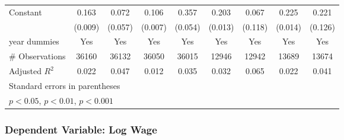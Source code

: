 \begin{sidewaystable}
\begin{tabular}{l*{2}{c}| *{2}{c}| *{2}{c}| *{2}{c}}
	Constant            &       0.163\sym{***}&       0.072         &       0.106\sym{***}&       0.357\sym{***}&       0.203\sym{***}&       0.067         &       0.225\sym{***}&       0.221         \\
	&     (0.009)         &     (0.057)         &     (0.007)         &     (0.054)         &     (0.013)         &     (0.118)         &     (0.014)         &     (0.126)         \\
	year dummies        &         Yes         &         Yes         &         Yes         &         Yes         &         Yes         &         Yes         &         Yes         &         Yes         \\
	\midrule
\#	Observations        &       36160         &       36132         &       36050         &       36015         &       12946         &       12942         &       13689         &       13674         \\
	Adjusted \(R^{2}\)  &       0.022         &       0.047         &       0.012         &       0.035         &       0.032         &       0.065         &       0.022         &       0.041         \\
	\bottomrule
	\multicolumn{9}{l}{\footnotesize Standard errors in parentheses}\\
	\multicolumn{9}{l}{\footnotesize \sym{*} \(p<0.05\), \sym{**} \(p<0.01\), \sym{***} \(p<0.001\)}
\end{tabular}
\end{sidewaystable}
\clearpage

\subsubsection{Dependent Variable: Log Wage}
\label{sec:wage_full}


